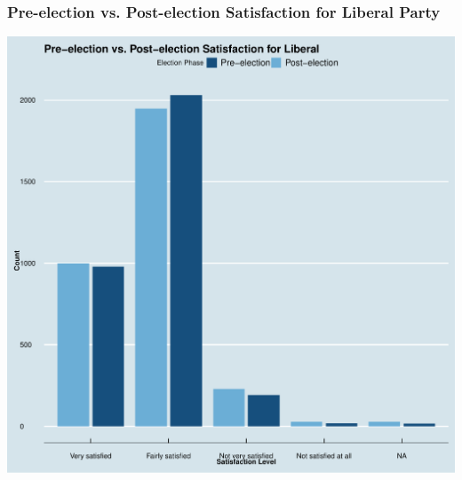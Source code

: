 \documentclass{beamer}
\begin{document}
\begin{frame}
    \frametitle{Pre-election vs. Post-election Satisfaction for Liberal Party}
    \begin{center}
        \includegraphics[scale=0.3]{Pre-election vs. Post-election Satisfaction for Liberal.pdf}
    \end{center}
\end{frame}


\end{document}
